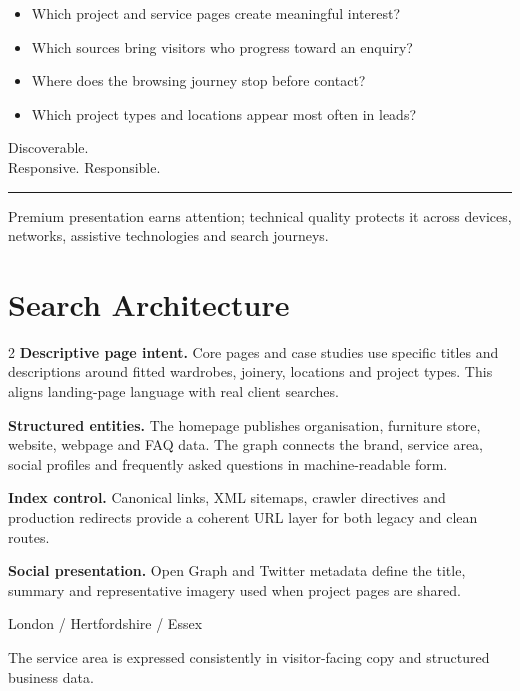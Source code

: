 \documentclass[10.5pt,a4paper]{article}
\newcommand{\eyebrow}[1]{%
  {\fontsize{7.8}{10}\selectfont\bfseries\color{MarkouStone}\textls[180]{\MakeUppercase{#1}}}%
}
\newcommand{\chapteropener}[3]{%
  \clearpage
  \thispagestyle{empty}
  \pagecolor{MarkouInk}\color{MarkouIvory}
  \vspace*{24mm}
  \eyebrow{#1}\par
  \vspace{9mm}
  {\DisplayFont\fontsize{43}{46}\selectfont #2\par}
  \vspace{8mm}
  {\color{MarkouStone}\rule{28mm}{1pt}}\par
  \vfill
  \begin{minipage}{0.69\textwidth}
    {\large\color{MarkouIvory}#3}
  \end{minipage}
  \vspace*{16mm}
  \clearpage
  \nopagecolor\color{MarkouInk}
}
\begin{document}
\begin{itemize}
  \item Which project and service pages create meaningful interest?
  \item Which sources bring visitors who progress toward an enquiry?
  \item Where does the browsing journey stop before contact?
  \item Which project types and locations appear most often in leads?
\end{itemize}

\chapteropener
  {04 / Quality foundation}
  {Discoverable.\\Responsive. Responsible.}
  {Premium presentation earns attention; technical quality protects it across
devices, networks, assistive technologies and search journeys.}

\section{Search Architecture}
\begin{multicols}{2}
\small
\textbf{Descriptive page intent.} Core pages and case studies use specific
titles and descriptions around fitted wardrobes, joinery, locations and
project types. This aligns landing-page language with real client searches.

\textbf{Structured entities.} The homepage publishes organisation, furniture
store, website, webpage and FAQ data. The graph connects the brand, service
area, social profiles and frequently asked questions in machine-readable form.

\columnbreak
\textbf{Index control.} Canonical links, XML sitemaps, crawler directives and
production redirects provide a coherent URL layer for both legacy and clean
routes.

\textbf{Social presentation.} Open Graph and Twitter metadata define the title,
summary and representative imagery used when project pages are shared.
\end{multicols}

\begin{darkbox}
\begin{center}
{\DisplayFont\fontsize{27}{30}\selectfont\color{MarkouStone}London / Hertfordshire / Essex}\par
\vspace{2mm}
{\small\color{MarkouIvory}The service area is expressed consistently in
visitor-facing copy and structured business data.}
\end{center}
\end{darkbox}
\end{document}
